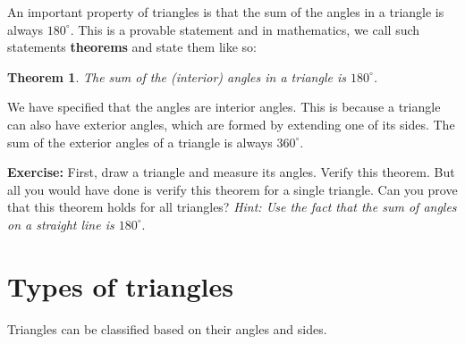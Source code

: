 \documentclass[11pt]{article}
\newtheorem{theorem}{Theorem}[section]
\begin{document}
An important property of triangles is that the sum of the angles in a triangle is always $180^\circ$. This is a provable statement and in mathematics, we call such statements \textbf{theorems} and state them like so:
\begin{theorem}
    The sum of the (interior) angles in a triangle is $180^\circ$.
    \label{thm:triangle_angles}
\end{theorem}
We have specified that the angles are interior angles. This is because a triangle can also have exterior angles, which are formed by extending one of its sides. The sum of the exterior angles of a triangle is always $360^\circ$.
\begin{framed}
    \textbf{Exercise:} First, draw a triangle and measure its angles. Verify this theorem. But all you would have done is verify this theorem for a single triangle. Can you prove that this theorem holds for all triangles? \textit{Hint: Use the fact that the sum of angles on a straight line is $180^\circ$}.
\end{framed}
\newpage
\section{Types of triangles}
Triangles can be classified based on their angles and sides.
\end{document}
